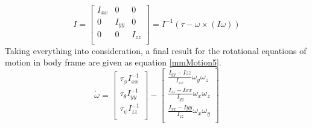 \begin{equation}
\label{mmMotion4}
 	I = \begin{bmatrix}
 	I_{xx}	& 0 		& 0			\\
 	0 		& I_{yy}	& 0			\\
 	0 		& 0 		& I_{zz}	\\ 
 	\end{bmatrix} = I^{-1}(\tau - \omega \times (I\omega ))
\end{equation}
Taking everything into consideration, a final result for the rotational equations of motion in body frame are given as equation \ref{mmMotion5}.
\begin{equation}
\label{mmMotion5}
 	\dot{\omega} = \begin{bmatrix}
 	\tau _\phi I_{xx}^{-1}		\\
 	\tau _\theta I_{yy}^{-1}	\\
 	\tau _\psi I_{zz}^{-1}		\\ 
 	\end{bmatrix} - \begin{bmatrix}
 	\frac{I_{yy}-I{zz}}{I_{xx}}\omega _y\omega _z	\\
 	\frac{I_{zz}-I{xx}}{I_{yy}}\omega _x\omega _z	\\
 	\frac{I_{xx}-I{yy}}{I_{zz}}\omega _x\omega _y	\\ 
 	\end{bmatrix}
\end{equation}